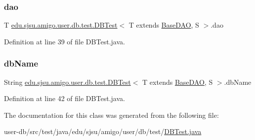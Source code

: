 \subsubsection{\texorpdfstring{dao}{dao}}
{\footnotesize\ttfamily T \hyperlink{classedu_1_1sjsu_1_1amigo_1_1user_1_1db_1_1test_1_1_d_b_test}{edu.\+sjsu.\+amigo.\+user.\+db.\+test.\+D\+B\+Test}$<$ T extends \hyperlink{interfaceedu_1_1sjsu_1_1amigo_1_1db_1_1common_1_1_base_d_a_o}{Base\+D\+AO}, S $>$.dao\hspace{0.3cm}{\ttfamily [protected]}}



Definition at line 39 of file D\+B\+Test.\+java.

\mbox{\label{classedu_1_1sjsu_1_1amigo_1_1user_1_1db_1_1test_1_1_d_b_test_a3f2573ce874e023900d80922923c6900}} 
\subsubsection{\texorpdfstring{db\+Name}{dbName}}
{\footnotesize\ttfamily String \hyperlink{classedu_1_1sjsu_1_1amigo_1_1user_1_1db_1_1test_1_1_d_b_test}{edu.\+sjsu.\+amigo.\+user.\+db.\+test.\+D\+B\+Test}$<$ T extends \hyperlink{interfaceedu_1_1sjsu_1_1amigo_1_1db_1_1common_1_1_base_d_a_o}{Base\+D\+AO}, S $>$.db\+Name}



Definition at line 42 of file D\+B\+Test.\+java.



The documentation for this class was generated from the following file\+:\begin{DoxyCompactItemize}
\item 
user-\/db/src/test/java/edu/sjsu/amigo/user/db/test/\hyperlink{_d_b_test_8java}{D\+B\+Test.\+java}\end{DoxyCompactItemize}
